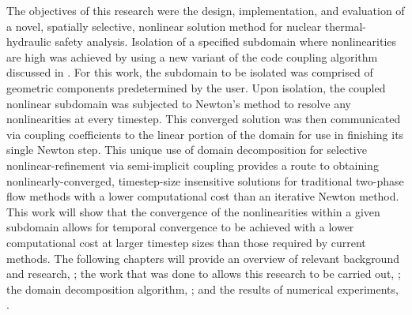 The objectives of this research were the design, implementation, and evaluation of a novel, spatially selective, nonlinear solution method for nuclear thermal-hydraulic safety analysis.
Isolation of a specified subdomain where nonlinearities are high was achieved by using a new variant of the code coupling algorithm discussed in .
For this work, the subdomain to be isolated was comprised of geometric components predetermined by the user.
Upon isolation, the coupled nonlinear subdomain was subjected to Newton's method to resolve any nonlinearities at every timestep.
This converged solution was then communicated via coupling coefficients to the linear portion of the domain for use in finishing its single Newton step.
This unique use of domain decomposition for selective nonlinear-refinement via semi-implicit coupling provides a route to obtaining nonlinearly-converged, timestep-size insensitive solutions for traditional two-phase flow methods with a lower computational cost than an iterative Newton method.
This work will show that the convergence of the nonlinearities within a given subdomain allows for temporal convergence to be achieved with a lower computational cost at larger timestep sizes than those required by current methods.
The following chapters will provide an overview of relevant background and research, ; the work that was done to allows this research to be carried out, ; the domain decomposition algorithm, ; and the results of numerical experiments, .
